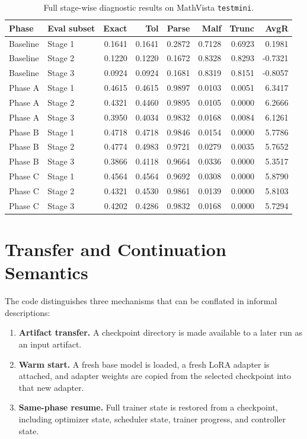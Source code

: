\documentclass{article} %
\begin{document}
\begin{table}[t]
\centering
\scriptsize
\caption{Full stage-wise diagnostic results on MathVista \texttt{testmini}.}
\label{tab:supp-stage}
\begin{tabular}{llrrrrrr}
\toprule
Phase & Eval subset & Exact & Tol & Parse & Malf & Trunc & AvgR \\
\midrule
Baseline & Stage 1 & 0.1641 & 0.1641 & 0.2872 & 0.7128 & 0.6923 & 0.1981 \\
Baseline & Stage 2 & 0.1220 & 0.1220 & 0.1672 & 0.8328 & 0.8293 & -0.7321 \\
Baseline & Stage 3 & 0.0924 & 0.0924 & 0.1681 & 0.8319 & 0.8151 & -0.8057 \\
Phase A & Stage 1 & 0.4615 & 0.4615 & 0.9897 & 0.0103 & 0.0051 & 6.3417 \\
Phase A & Stage 2 & 0.4321 & 0.4460 & 0.9895 & 0.0105 & 0.0000 & 6.2666 \\
Phase A & Stage 3 & 0.3950 & 0.4034 & 0.9832 & 0.0168 & 0.0084 & 6.1261 \\
Phase B & Stage 1 & 0.4718 & 0.4718 & 0.9846 & 0.0154 & 0.0000 & 5.7786 \\
Phase B & Stage 2 & 0.4774 & 0.4983 & 0.9721 & 0.0279 & 0.0035 & 5.7652 \\
Phase B & Stage 3 & 0.3866 & 0.4118 & 0.9664 & 0.0336 & 0.0000 & 5.3517 \\
Phase C & Stage 1 & 0.4564 & 0.4564 & 0.9692 & 0.0308 & 0.0000 & 5.8790 \\
Phase C & Stage 2 & 0.4321 & 0.4530 & 0.9861 & 0.0139 & 0.0000 & 5.8103 \\
Phase C & Stage 3 & 0.4202 & 0.4286 & 0.9832 & 0.0168 & 0.0000 & 5.7294 \\
\bottomrule
\end{tabular}
\end{table}

\section{Transfer and Continuation Semantics}

The code distinguishes three mechanisms that can be conflated in informal descriptions:
\begin{enumerate}[leftmargin=1.2em]
\item \textbf{Artifact transfer.} A checkpoint directory is made available to a later run as an input artifact.
\item \textbf{Warm start.} A fresh base model is loaded, a fresh LoRA adapter is attached, and adapter weights are copied from the selected checkpoint into that new adapter.
\item \textbf{Same-phase resume.} Full trainer state is restored from a checkpoint, including optimizer state, scheduler state, trainer progress, and controller state.
\end{enumerate}
\end{document}
